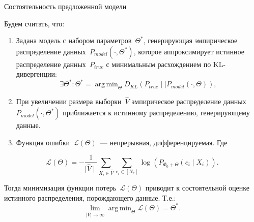 \documentclass[9pt,pdf,hyperref={unicode}]{beamer}
\DeclareMathOperator*{\argmin}{arg\,min}
\begin{document}
\begin{frame}{Состоятельность предложенной модели}
\justifying

\begin{theorem}
\label{theorem:1}
Будем считать, что: 
\begin{enumerate}
    \item Задана модель с набором параметров~$\Theta^*$, генерирующая эмпирическое распределение данных~$P_{model}(\cdot, \Theta^*)$, которое аппроксимирует истинное распределение данных~$P_{true}$ с минимальным расхождением по KL-дивергенции: 
    \begin{equation}
    \label{eq:1}
    \exists \Theta^*: \Theta^* = \argmin _\Theta D_{KL}(P_{true} \mid\mid P_{model}(\cdot, \Theta)),
    \end{equation}
     \item При увеличении размера выборки~$\hat{V}$ эмпирическое распределение данных $P_{model}(\cdot, \Theta^*)$ приближается к истинному распределению, генерирующему данные.
     \item Функция ошибки~$\mathscr{L}(\Theta)$~--- непрерывная, дифференцируемая. Где
\end{enumerate}
\begin{equation}
\label{eq:2.1}
\mathscr{L}(\Theta) = -\frac{1}{\mid \hat{V} \mid} \sum_{X_i \in \hat{V}} \sum_{c_i \in [N_c]} \log \left(P_{\Phi_0+\Theta}\left(c_i \mid X_i\right)\right).
\end{equation}

Тогда минимизация функции потерь~$\mathscr{L}(\Theta)$ приводит к состоятельной оценке истинного распределения, порождающего данные. Т.е.: 
\begin{equation}
\label{eq:2.2}
    \lim_{\mid\hat{V}\mid\to\infty} \argmin _\Theta \mathscr{L}(\Theta) = \Theta^*.
\end{equation}

\end{theorem}

\end{frame}
\end{document}
